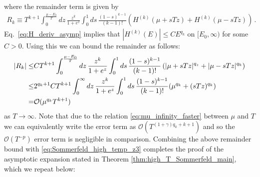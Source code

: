 \documentclass[sn-mathphys,Numbered]{sn-jnl}
\begin{document}
where the remainder term is given by
\begin{align}
    R_k\equiv T^{k+1}\int_0^{\frac{\mu-E_0}{T}} dz \,\frac{z^k}{1+e^{z}}
 \int_0^1 ds\, \frac{(1-s)^{k-1}}{(k-1)!} (H^{(k)}(\mu+sTz)+H^{(k)}(\mu-sTz))\,.
\end{align}
Eq.~\eqref{eq:H_deriv_asymp} implies that $|H^{(k)}(E)|\leq CE^{q_k}$ on $[E_0,\infty)$ for some $C>0$. Using this we can bound the remainder as follows:
\begin{align}
    |R_k|\leq &CT^{k+1}\int_0^{\frac{\mu-E_0}{T}} dz \,\frac{z^k}{1+e^{z}}
 \int_0^1 ds\, \frac{(1-s)^{k-1}}{(k-1)!} \left(|\mu+sTz|^{q_z}+|\mu-sTz|^{q_k}\right)\notag\\
 \leq&2^{q_k+1}CT^{k+1}\int_0^{\infty} dz \,\frac{z^k}{1+e^{z}}\notag
 \int_0^1 ds\, \frac{(1-s)^{k-1}}{(k-1)!} (\mu^{q_k}+(sTz)^{q_k})\notag\\
 =&\mathcal{O}(\mu^{q_k}T^{k+1})\label{eq:Sommerfeld_high_T_remainder_bound}
\end{align}
as $T\to\infty$.  Note that due to the  relation \eqref{eq:mu_infinity_faster} between $\mu$ and $T$ we can equivalently write the error term as $\mathcal{O}(T^{(1+\gamma)q_k+k+1})$ and so the $\mathcal{O}(T^{-p})$ error term is negligible in comparison. Combining the above remainder bound with \eqref{eq:Sommerfeld_high_temp_z3} completes the proof of the asymptotic expansion stated in Theorem \ref{thm:high_T_Sommerfeld_main}, which we repeat below:
\end{document}
